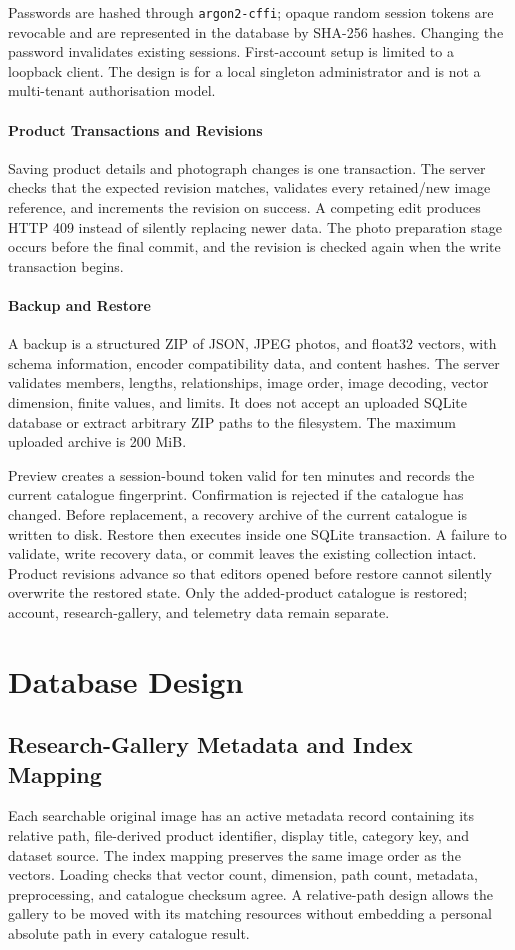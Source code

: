 Passwords are hashed through \texttt{argon2-cffi}; opaque random session tokens
are revocable and are represented in the database by SHA-256 hashes. Changing
the password invalidates existing sessions. First-account setup is limited to a
loopback client. The design is for a local singleton administrator and is not
a multi-tenant authorisation model.

\paragraph{Product Transactions and Revisions}
Saving product details and photograph changes is one transaction. The server
checks that the expected revision matches, validates every retained/new image
reference, and increments the revision on success. A competing edit produces
HTTP 409 instead of silently replacing newer data. The photo preparation stage
occurs before the final commit, and the revision is checked again when the write
transaction begins.

\paragraph{Backup and Restore}
A backup is a structured ZIP of JSON, JPEG photos, and float32 vectors, with
schema information, encoder compatibility data, and content hashes. The server
validates members, lengths, relationships, image order, image decoding, vector
dimension, finite values, and limits. It does not accept an uploaded SQLite
database or extract arbitrary ZIP paths to the filesystem. The maximum uploaded
archive is 200 MiB.

Preview creates a session-bound token valid for ten minutes and records the
current catalogue fingerprint. Confirmation is rejected if the catalogue has
changed. Before replacement, a recovery archive of the current catalogue is
written to disk. Restore then executes inside one SQLite transaction. A failure
to validate, write recovery data, or commit leaves the existing collection
intact. Product revisions advance so that editors opened before restore cannot
silently overwrite the restored state. Only the added-product catalogue is
restored; account, research-gallery, and telemetry data remain separate.

\section{Database Design}
\subsection{Research-Gallery Metadata and Index Mapping}
Each searchable original image has an active metadata record containing its
relative path, file-derived product identifier, display title, category key,
and dataset source. The index mapping preserves the same image order as the
vectors. Loading checks that vector count, dimension, path count, metadata,
preprocessing, and catalogue checksum agree. A relative-path design allows the
gallery to be moved with its matching resources without embedding a personal
absolute path in every catalogue result.

